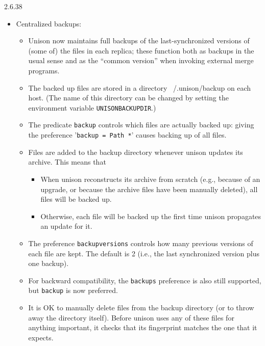\begin{changesfromversion}{2.6.38}
\begin{itemize}
\item Centralized backups:
\begin{itemize}
  \item Unison now maintains full backups of the last-synchronized versions
      of (some of) the files in each replica; these function both as
      backups in the usual sense
      and as the ``common version'' when invoking external
      merge programs.
  \item The backed up files are stored in a directory ~/.unison/backup on each
      host.  (The name of this directory can be changed by setting
      the environment variable \verb|UNISONBACKUPDIR|.)
  \item The predicate \verb|backup| controls which files are actually
     backed up:
      giving the preference '\verb|backup = Path *|' causes backing up
      of all files.
  \item Files are added to the backup directory whenever unison updates
      its archive.  This means that
      \begin{itemize}
       \item When unison reconstructs its archive from scratch (e.g., 
           because of an upgrade, or because the archive files have
           been manually deleted), all files will be backed up.
       \item Otherwise, each file will be backed up the first time unison
           propagates an update for it.
      \end{itemize}
  \item The preference \verb|backupversions| controls how many previous
      versions of each file are kept.  The default is 2 (i.e., the last 
      synchronized version plus one backup).
  \item For backward compatibility, the \verb|backups| preference is also
      still supported, but \verb|backup| is now preferred.
  \item It is OK to manually delete files from the backup directory (or to throw
      away the directory itself).  Before unison uses any of these files for 
      anything important, it checks that its fingerprint matches the one 
      that it expects. 
\end{itemize}


\end{itemize}
\end{changesfromversion}
